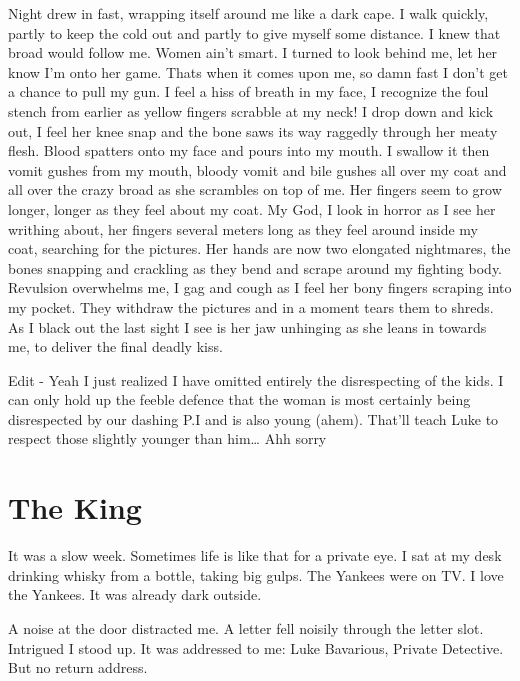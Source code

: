 Night drew in fast, wrapping itself around me like a dark cape. I
walk quickly, partly to keep the cold out and partly to give myself
some distance. I knew that broad would follow me. Women ain't
smart. I turned to look behind me, let her know I'm onto her game.
Thats when it comes upon me, so damn fast I don't get a chance to
pull my gun. I feel a hiss of breath in my face, I recognize the
foul stench from earlier as yellow fingers scrabble at my neck! I
drop down and kick out, I feel her knee snap and the bone saws its
way raggedly through her meaty flesh. Blood spatters onto my face
and pours into my mouth. I swallow it then vomit gushes from my
mouth, bloody vomit and bile gushes all over my coat and all over
the crazy broad as she scrambles on top of me. Her fingers seem to
grow longer, longer as they feel about my coat. My God, I look in
horror as I see her writhing about, her fingers several meters long
as they feel around inside my coat, searching for the pictures. Her
hands are now two elongated nightmares, the bones snapping and
crackling as they bend and scrape around my fighting body.
Revulsion overwhelms me, I gag and cough as I feel her bony fingers
scraping into my pocket. They withdraw the pictures and in a moment
tears them to shreds. As I black out the last sight I see is her
jaw unhinging as she leans in towards me, to deliver the final
deadly kiss.





Edit - Yeah I just realized I have omitted entirely the
disrespecting of the kids. I can only hold up the feeble defence
that the woman is most certainly being disrespected by our dashing
P.I and is also young (ahem). That'll teach Luke to respect those
slightly younger than him{\ldots} Ahh sorry  
 



\chapter{The King}





It was a slow week. Sometimes life is like that for a private eye.
I sat at my desk drinking whisky from a bottle, taking big gulps.
The Yankees were on TV. I love the Yankees. It was already dark
outside.



A noise at the door distracted me. A letter fell noisily through
the letter slot. Intrigued I stood up. It was addressed to me: Luke
Bavarious, Private Detective. But no return address.



